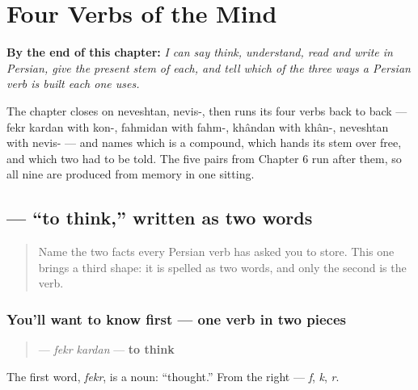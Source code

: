 
\chapter{Four Verbs of the Mind}
\label{ch:fa-mind-verbs}

\begin{chapteropening}
\textbf{By the end of this chapter:} \emph{I can say think, understand, read and write in Persian, give the present stem of each, and tell which of the three ways a Persian verb is built each one uses.}

The chapter closes on neveshtan, nevis-, then runs its four verbs back to back — fekr kardan with kon-, fahmidan with fahm-, khândan with khân-, neveshtan with nevis- — and names which is a compound, which hands its stem over free, and which two had to be told. The five pairs from Chapter 6 run after them, so all nine are produced from memory in one sitting.
\end{chapteropening}

\section[\texorpdfstring{\fa{فکر} \fa{کردن} (fekr kardan)}{فکر کردن (fekr kardan)}]{  — “to think,” written as two words}

\label{lesson:FA-C07-fekr-kardan}



\begin{quote}
Name the two facts every Persian verb has asked you to store. This one brings a third shape: it is spelled as two words, and only the second is the verb.
\end{quote}

\subsection*{You'll want to know first — one verb in two pieces}
\begin{quote}
\textbf{ } — \emph{fekr kardan} — \textbf{to think}
\end{quote}

The first word, \textbf{} \emph{fekr}, is a noun: “thought.” From the right — \textbf{} \emph{f}, \textbf{} \emph{k}, \textbf{} \emph{r}.

